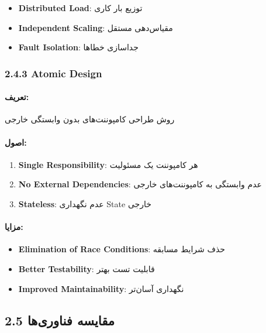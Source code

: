 \documentclass[
]{article}
\providecommand{\tightlist}{%
  \setlength{\itemsep}{0pt}\setlength{\parskip}{0pt}}
\begin{document}
\begin{itemize}
\tightlist
\item
  \textbf{Distributed Load}: توزیع بار کاری
\item
  \textbf{Independent Scaling}: مقیاس‌دهی مستقل
\item
  \textbf{Fault Isolation}: جداسازی خطاها
\end{itemize}

\subsubsection{2.4.3 Atomic Design}\label{atomic-design}

\paragraph{تعریف:}\label{ux62aux639ux631ux6ccux641-2}

روش طراحی کامپوننت‌های بدون وابستگی خارجی

\paragraph{اصول:}\label{ux627ux635ux648ux644}

\begin{enumerate}
\def\labelenumi{\arabic{enumi}.}
\tightlist
\item
  \textbf{Single Responsibility}: هر کامپوننت یک مسئولیت
\item
  \textbf{No External Dependencies}: عدم وابستگی به کامپوننت‌های خارجی
\item
  \textbf{Stateless}: عدم نگهداری State خارجی
\end{enumerate}

\paragraph{مزایا:}\label{ux645ux632ux627ux6ccux627-3}

\begin{itemize}
\tightlist
\item
  \textbf{Elimination of Race Conditions}: حذف شرایط مسابقه
\item
  \textbf{Better Testability}: قابلیت تست بهتر
\item
  \textbf{Improved Maintainability}: نگهداری آسان‌تر
\end{itemize}

\subsection{2.5 مقایسه
فناوری‌ها}\label{ux645ux642ux627ux6ccux633ux647-ux641ux646ux627ux648ux631ux6ccux647ux627}
\end{document}

